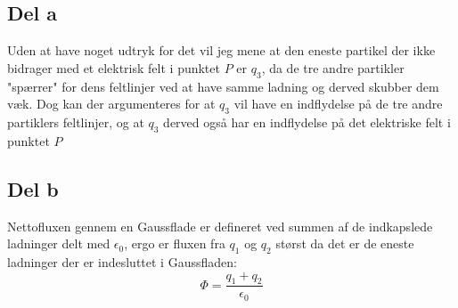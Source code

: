 \subsection{Del a} %
\label{sub:del_a}
Uden at have noget udtryk for det vil jeg mene at den eneste partikel der ikke bidrager med et elektrisk felt i punktet $P$ er $q_3$, da de tre andre partikler "spærrer" for dens feltlinjer ved at have samme ladning og derved skubber dem væk. Dog kan der argumenteres for at $q_3$ vil have en indflydelse på de tre andre partiklers feltlinjer, og at $q_3$ derved også har en indflydelse på det elektriske felt i punktet $P$

\subsection{Del b} %
\label{sub:del_b}
Nettofluxen gennem en Gaussflade er defineret ved summen af de indkapslede ladninger delt med $\epsilon _0$, ergo er fluxen fra $q_1$ og $q_2$ størst da det er de eneste ladninger der er indesluttet i Gaussfladen:
\begin{equation}
	\Phi = \frac{q_1 + q_2}{\epsilon _0}
\end{equation}
